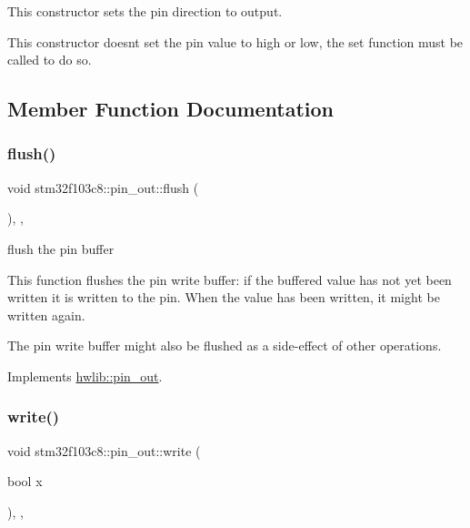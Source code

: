 This constructor sets the pin direction to output.

This constructor doesn\textquotesingle{}t set the pin value to high or low, the set function must be called to do so. 

\subsection{Member Function Documentation}
\mbox{\label{classstm32f103c8_1_1pin__out_a401a547302edb7ceb655e5d4be0af6a8}} 
\subsubsection{\texorpdfstring{flush()}{flush()}}
{\footnotesize\ttfamily void stm32f103c8\+::pin\+\_\+out\+::flush (\begin{DoxyParamCaption}{ }\end{DoxyParamCaption})\hspace{0.3cm}{\ttfamily [inline]}, {\ttfamily [override]}, {\ttfamily [virtual]}}





flush the pin buffer

This function flushes the pin write buffer\+: if the buffered value has not yet been written it is written to the pin. When the value has been written, it might be written again.

The pin write buffer might also be flushed as a side-\/effect of other operations. 

Implements \hyperlink{classhwlib_1_1pin__out_ac22910317477a52431a44e7e3c66fc57}{hwlib\+::pin\+\_\+out}.

\mbox{\label{classstm32f103c8_1_1pin__out_af1d21fc8d9b0d8dc2c4b5e9aadef12f5}} 
\subsubsection{\texorpdfstring{write()}{write()}}
{\footnotesize\ttfamily void stm32f103c8\+::pin\+\_\+out\+::write (\begin{DoxyParamCaption}\item[{bool}]{x }\end{DoxyParamCaption})\hspace{0.3cm}{\ttfamily [inline]}, {\ttfamily [override]}, {\ttfamily [virtual]}}





